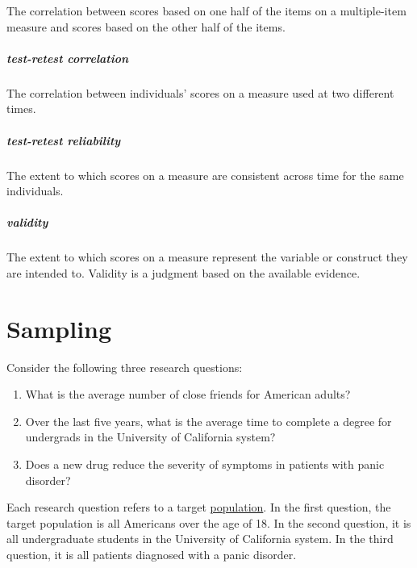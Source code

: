 \documentclass[
]{krantz}
\providecommand{\tightlist}{%
  \setlength{\itemsep}{0pt}\setlength{\parskip}{0pt}}
\begin{document}
The correlation between scores based on one half of the items on a multiple-item measure and scores based on the other half of the items.

\paragraph*{test-retest correlation}\label{test-retest-correlation}

The correlation between individuals' scores on a measure used at two different times.

\paragraph*{test-retest reliability}\label{test-retest-reliability-1}

The extent to which scores on a measure are consistent across time for the same individuals.

\paragraph*{validity}\label{validity-1}

The extent to which scores on a measure represent the variable or construct they are intended to. Validity is a judgment based on the available evidence.

\chapter{Sampling}\label{sampling}

Consider the following three research questions:

\begin{enumerate}
\def\labelenumi{\arabic{enumi}.}
\tightlist
\item
  What is the average number of close friends for American adults?
\item
  Over the last five years, what is the average time to complete a degree for undergrads in the University of California system?
\item
  Does a new drug reduce the severity of symptoms in patients with panic disorder?
\end{enumerate}

Each research question refers to a target \hyperref[population]{population}. In the first question, the target population is all Americans over the age of 18. In the second question, it is all undergraduate students in the University of California system. In the third question, it is all patients diagnosed with a panic disorder.
\end{document}

